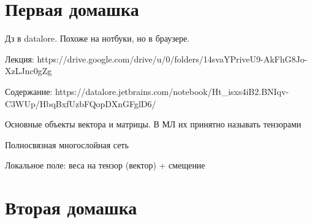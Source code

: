 




\section{Первая домашка}

Дз в datalore. Похоже на нотбуки, но в браузере.

Лекция:
https://drive.google.com/drive/u/0/folders/14svaYPriveU9-AkFhG8Jo-XzLJnc0gZg

Содержание:
https://datalore.jetbrains.com/notebook/Ht_isxs4iB2.BNIqv-C3WUp/HbqBxfUzbFQopDXnGFglD6/

Основные объекты вектора и матрицы. В МЛ их принятно называть тензорами



Полносвязная многослойная сеть

Локальное поле: веса на тензор (вектор) + смещение

\section{Вторая домашка}


